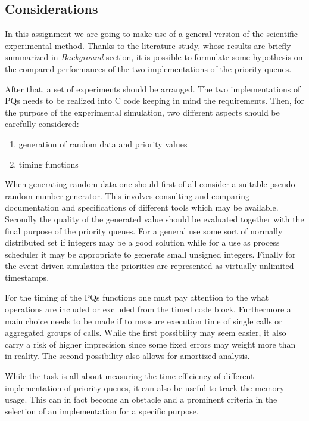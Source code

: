 \documentclass{article}
\begin{document}
\subsection{Considerations}
In this assignment we are going to make use of a general version of the scientific experimental method. Thanks to the literature study, whose results are briefly summarized in \textit{Background} section, it is possible to formulate some hypothesis on the compared performances of the two implementations of the priority queues.

After that, a set of experiments should be arranged. The two implementations of PQs needs to be realized into C code keeping in mind the requirements. Then, for the purpose of the experimental simulation, two different aspects should be carefully considered:

\begin{enumerate}
    \item generation of random data and priority values
    \item timing functions
\end{enumerate}

When generating random data one should first of all consider a suitable pseudo-random number generator. This involves consulting and comparing documentation and specifications of different tools which may be available.
Secondly the quality of the generated value should be evaluated together with the final purpose of the priority queues. For a general use some sort of normally distributed set if integers may be a good solution while for a use as process scheduler it may be appropriate to generate small unsigned integers. Finally for the event-driven simulation the priorities are represented as virtually unlimited timestamps.

For the timing of the PQs functions one must pay attention to the what operations are included or excluded from the timed code block. Furthermore a main choice needs to be made if to measure execution time of single calls or aggregated groups of calls. While the first possibility may seem easier, it also carry a risk of higher imprecision since some fixed errors may weight more than in reality. The second possibility also allows for amortized analysis.

While the task is all about measuring the time efficiency of different implementation of priority queues, it can also be useful to track the memory usage. This can in fact become an obstacle and a prominent criteria in the selection of an implementation for a specific purpose.
\end{document}
